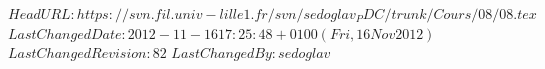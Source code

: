 \svnidlong 
{$HeadURL: https://svn.fil.univ-lille1.fr/svn/sedoglav_PDC/trunk/Cours/08/08.tex $} 
{$LastChangedDate: 2012-11-16 17:25:48 +0100 (Fri, 16 Nov 2012) $} 
{$LastChangedRevision: 82 $} 
{$LastChangedBy: sedoglav $} 
